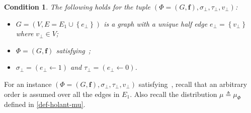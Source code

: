 \documentclass[11pt]{article}
\newtheorem*{remark}{Remark}
\newtheorem{condition}{Condition}
\newcommand{\set}[1]{\left\{#1\right\}}
\newcommand{\vecf}{\boldsymbol{f}}
\newcommand{\qtodo}[1]{\todo[color = purple!40, size = \tiny]{\textbf{guoliang:} #1}}
\newcommand{\hktodo}[1]{{\color{blue}{#1}}}
\begin{document}
 
\begin{condition}\label{cond-instancepair}
    The following holds for the tuple $\left(\Phi = (G, \vecf),  \sigma_\bot, \tau_\bot,v_{\bot}\right)$:
    \begin{itemize}
        \item $G = (V, E = E_1 \cup \set{e_\bot})$ is a graph with a unique half edge $e_\bot = \set{v_{\bot}}$ where $v_\bot \in V$;
        \item $\Phi=(G,\vecf)$ satisfying~;
		\item $\sigma_\bot = (e_\bot \gets 1)$ and $\tau_\bot = (e_\bot \gets 0)$.
    \end{itemize}
\end{condition}
    
For an instance $(\Phi = (G, \vecf), \sigma_\bot, \tau_\bot, v_\bot)$ satisfying~, recall that an arbitrary order is assumed over all the edges in $E_1$.
Also recall the distribution $\mu \triangleq \mu_{\Phi}$ defined in \eqref{def-holant-mu}.

\hktodo{move the notation disagreeing and discrepancy}
    
\end{document}
